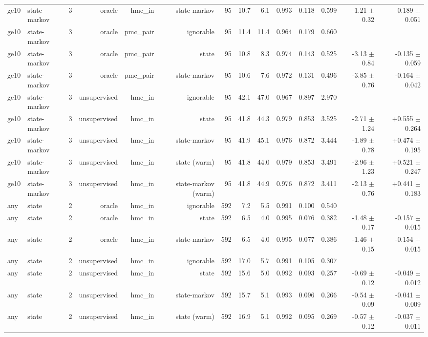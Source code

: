 \begin{table}[ht]
\begin{tabular}{llrrrrrrrrrrrr}
ge10 & state-markov & 3 & oracle & hmc\_in & state-markov & 95 & 10.7 & 6.1 & 0.993 & 0.118 & 0.599 & -1.21 $\pm$ 0.32 & -0.189 $\pm$ 0.051 \\
ge10 & state-markov & 3 & oracle & pmc\_pair & ignorable & 95 & 11.4 & 11.4 & 0.964 & 0.179 & 0.660 &  &  \\
ge10 & state-markov & 3 & oracle & pmc\_pair & state & 95 & 10.8 & 8.3 & 0.974 & 0.143 & 0.525 & -3.13 $\pm$ 0.84 & -0.135 $\pm$ 0.059 \\
ge10 & state-markov & 3 & oracle & pmc\_pair & state-markov & 95 & 10.6 & 7.6 & 0.972 & 0.131 & 0.496 & -3.85 $\pm$ 0.76 & -0.164 $\pm$ 0.042 \\
ge10 & state-markov & 3 & unsupervised & hmc\_in & ignorable & 95 & 42.1 & 47.0 & 0.967 & 0.897 & 2.970 &  &  \\
ge10 & state-markov & 3 & unsupervised & hmc\_in & state & 95 & 41.8 & 44.3 & 0.979 & 0.853 & 3.525 & -2.71 $\pm$ 1.24 & +0.555 $\pm$ 0.264 \\
ge10 & state-markov & 3 & unsupervised & hmc\_in & state-markov & 95 & 41.9 & 45.1 & 0.976 & 0.872 & 3.444 & -1.89 $\pm$ 0.78 & +0.474 $\pm$ 0.195 \\
ge10 & state-markov & 3 & unsupervised & hmc\_in & state (warm) & 95 & 41.8 & 44.0 & 0.979 & 0.853 & 3.491 & -2.96 $\pm$ 1.23 & +0.521 $\pm$ 0.247 \\
ge10 & state-markov & 3 & unsupervised & hmc\_in & state-markov (warm) & 95 & 41.8 & 44.9 & 0.976 & 0.872 & 3.411 & -2.13 $\pm$ 0.76 & +0.441 $\pm$ 0.183 \\
any & state & 2 & oracle & hmc\_in & ignorable & 592 & 7.2 & 5.5 & 0.991 & 0.100 & 0.540 &  &  \\
any & state & 2 & oracle & hmc\_in & state & 592 & 6.5 & 4.0 & 0.995 & 0.076 & 0.382 & -1.48 $\pm$ 0.17 & -0.157 $\pm$ 0.015 \\
any & state & 2 & oracle & hmc\_in & state-markov & 592 & 6.5 & 4.0 & 0.995 & 0.077 & 0.386 & -1.46 $\pm$ 0.15 & -0.154 $\pm$ 0.015 \\
any & state & 2 & unsupervised & hmc\_in & ignorable & 592 & 17.0 & 5.7 & 0.991 & 0.105 & 0.307 &  &  \\
any & state & 2 & unsupervised & hmc\_in & state & 592 & 15.6 & 5.0 & 0.992 & 0.093 & 0.257 & -0.69 $\pm$ 0.12 & -0.049 $\pm$ 0.012 \\
any & state & 2 & unsupervised & hmc\_in & state-markov & 592 & 15.7 & 5.1 & 0.993 & 0.096 & 0.266 & -0.54 $\pm$ 0.09 & -0.041 $\pm$ 0.009 \\
any & state & 2 & unsupervised & hmc\_in & state (warm) & 592 & 16.9 & 5.1 & 0.992 & 0.095 & 0.269 & -0.57 $\pm$ 0.12 & -0.037 $\pm$ 0.011 \\

\end{tabular}
\end{table}
